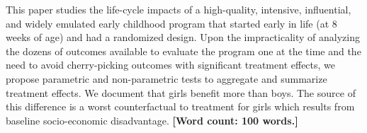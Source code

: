 \noindent This paper studies the life-cycle impacts of a high-quality, intensive, influential, and widely emulated early childhood program that started early in life (at 8 weeks of age) and had a randomized design. Upon the impracticality of analyzing the dozens of outcomes available to evaluate the program one at the time and the need to avoid cherry-picking outcomes with significant treatment effects, we propose parametric and non-parametric tests to aggregate and summarize treatment effects. We document that girls benefit more than boys. The source of this difference is a worst counterfactual to treatment for girls which results from baseline socio-economic disadvantage. \textbf{[Word count: 100 words.]}
